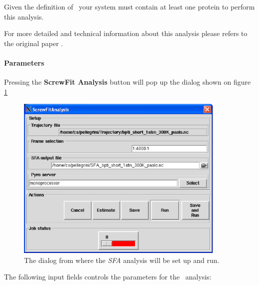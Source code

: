\documentclass[a4paper,11pt]{report}
\begin{document}
Given the definition of \SFA\, your system must contain at least one protein to perform this analysis.

For more detailed and technical information about this analysis please refers to the original paper \cite{Calligari}.
\newpage
\paragraph{Parameters\\}
\label{sfa_parameters}
Pressing the \textbf{ScrewFit Analysis} button will pop up the dialog shown on figure \ref{fig:sfa}
\begin{figure}[h!]
\begin{center}
\includegraphics[width=10cm]{Figures/sfa.eps}
\end{center}
\caption[The \textit{SFA} analysis dialog]{The dialog from where the \textit{SFA} analysis will be set up and run.}
\label{fig:sfa}
\end{figure}   

The following input fields controls the parameters for the \SFA\ analysis:
\end{document}
